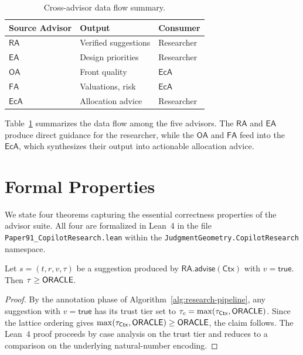 \documentclass[11pt]{article}
\newcommand{\RA}{\mathsf{RA}}
\newcommand{\EA}{\mathsf{EA}}
\newcommand{\OA}{\mathsf{OA}}
\newcommand{\FA}{\mathsf{FA}}
\newcommand{\EcA}{\mathsf{EcA}}
\newcommand{\Context}{\mathsf{Ctx}}
\begin{document}
\begin{table}[t]
\centering
\caption{Cross-advisor data flow summary.}
\label{tab:cross-advisor}
\begin{tabular}{lll}
\hline
\textbf{Source Advisor} & \textbf{Output} &
  \textbf{Consumer} \\
\hline
$\RA$ & Verified suggestions & Researcher \\
$\EA$ & Design priorities & Researcher \\
$\OA$ & Front quality & $\EcA$ \\
$\FA$ & Valuations, risk & $\EcA$ \\
$\EcA$ & Allocation advice & Researcher \\
\hline
\end{tabular}
\end{table}

Table~\ref{tab:cross-advisor} summarizes the data flow among the
five advisors.  The $\RA$ and $\EA$ produce direct guidance for
the researcher, while the $\OA$ and $\FA$ feed into the $\EcA$,
which synthesizes their output into actionable allocation advice.

\section{Formal Properties}\label{sec:formal}

We state four theorems capturing the essential correctness
properties of the advisor suite.  All four are formalized in
Lean~4 in the file
\texttt{Paper91\_CopilotResearch.lean} within the
\texttt{JudgmentGeometry.CopilotResearch} namespace.

\begin{theorem}\label{thm:advice-sound}
Let $s = (t, r, v, \tau)$ be a suggestion produced by
$\RA.\mathsf{advise}(\Context)$ with $v = \mathsf{true}$.
Then $\tau \geq \mathsf{ORACLE}$.
\end{theorem}
\begin{proof}
By the annotation phase of Algorithm~\ref{alg:research-pipeline},
any suggestion with $v = \mathsf{true}$ has its trust tier set to
$\tau_c = \max(\tau_\Context, \Toracle)$.  Since the lattice
ordering gives $\max(\tau_\Context, \Toracle) \geq \Toracle$, the
claim follows.  The Lean~4 proof proceeds by case analysis on
the trust tier and reduces to a comparison on the underlying
natural-number encoding.
\end{proof}
\end{document}
